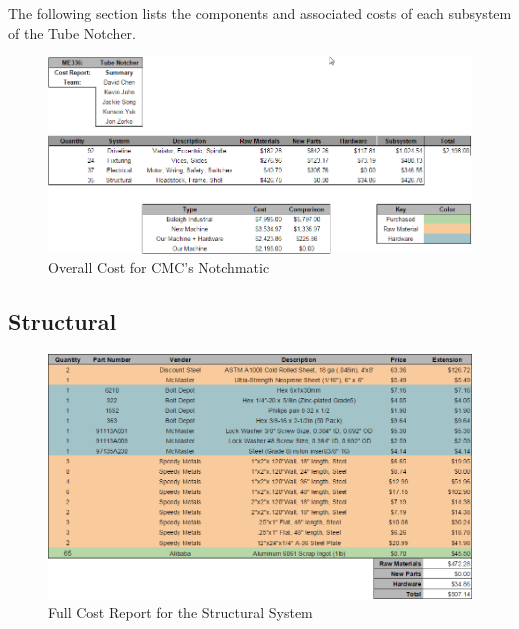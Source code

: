 The following section lists the components and associated costs of each subsystem of the Tube Notcher.

\begin{figure}[H]
    \centering
    \includegraphics[width=1.0\textwidth]{./fall-report pictures/Chapter4-BillofMaterials/Overall}
    \caption{Overall Cost for CMC's Notchmatic}
    \label{fig:Overall}
\end{figure}

\newpage

\subsection{Structural}

\begin{figure}[H]
    \centering
    \includegraphics[width=1.0\textwidth]{./fall-report pictures/Chapter4-BillofMaterials/CRS}
    \caption{Full Cost Report for the Structural System}
    \label{fig:CRS}
\end{figure}

